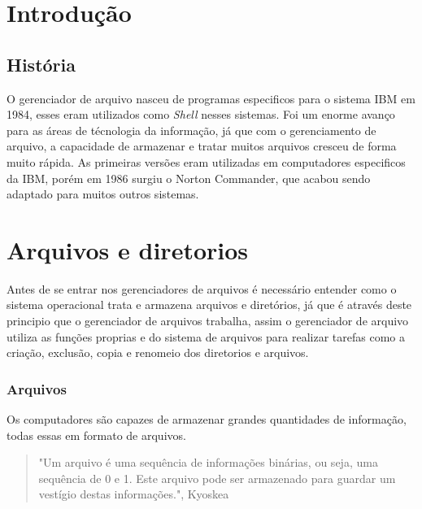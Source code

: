 \documentclass[
	12pt,				%
	openright,			%
	twoside,			%
	a4paper,			%
	chapter=TITLE,		%
	section=TITLE,		%
	english,	
	brazil				%
]{abntex2}
\begin{document}
\imprimircapa

\imprimirfolhaderosto

\tableofcontents

\maketitle

\chapter{Introdução}



\section{História}

O gerenciador de arquivo nasceu de programas especificos para o sistema IBM em 1984, esses eram utilizados como \textit{Shell} nesses sistemas. Foi um enorme avanço para as áreas de técnologia da informação, já que com o gerenciamento de arquivo, a capacidade de armazenar e tratar muitos arquivos cresceu de forma muito rápida. As primeiras versões eram utilizadas em computadores especificos da IBM, porém em 1986 surgiu o Norton Commander, que acabou sendo adaptado para muitos outros sistemas.

\chapter{Arquivos e diretorios}

Antes de se entrar nos gerenciadores de arquivos é necessário entender como o sistema operacional trata e armazena arquivos e diretórios, já que é através deste principio que o gerenciador de arquivos trabalha, assim o gerenciador de arquivo utiliza as funções proprias e do sistema de arquivos para realizar tarefas como a criação, exclusão, copia e renomeio dos diretorios e arquivos.

\subsection{Arquivos}

Os computadores são capazes de armazenar grandes quantidades de informação, todas essas em formato de arquivos.

 \begin{quote}
"Um arquivo é uma sequência de informações binárias, ou seja, uma sequência de 0 e 1. Este arquivo pode ser armazenado para guardar um vestígio destas informações.", Kyoskea
\end{quote}
\end{document}
